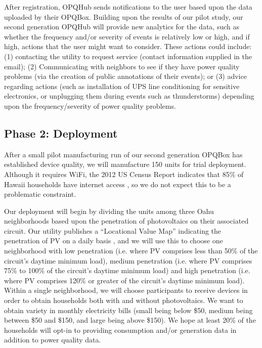 After registration, OPQHub sends notifications to the user based upon the data uploaded by their OPQBox.  Building upon the results of our pilot study, our second generation OPQHub will provide new analytics for the data, such as whether the frequency and/or severity of events is relatively low or high, and if high, actions that the user might want to consider.  These actions could include: (1) contacting the utility to request service (contact information supplied in the email); (2) Communicating with neighbors to see if they have power quality problems (via the creation of public annotations of their events); or (3) advice regarding actions (such as installation of UPS line conditioning for sensitive electronics, or unplugging them during events such as thunderstorms) depending upon the frequency/severity of power quality problems.

\subsection{Phase 2: Deployment}

After a small pilot manufacturing run of our second generation OPQBox has established device quality, we will manufacture 150 units for trial deployment.  Although it requires WiFi, the 2012 US Census Report indicates that 85\% of Hawaii households have internet access \cite{home-internet-access}, so we do not expect this to be a problematic constraint. 

Our deployment will begin by dividing the units among three Oahu neighborhoods based upon the penetration of photovoltaics on their associated circuit.  Our utility publishes a ``Locational Value Map'' indicating the penetration of PV on a daily basis \cite{lvm}, and we will use this to choose one neighborhood with low penetration (i.e. where PV comprises less than 50\% of the circuit's daytime minimum load), medium penetration (i.e. where PV comprises 75\% to 100\% of the circuit's daytime minimum load) and high penetration (i.e. where PV comprises 120\% or greater of the circuit's daytime minimum load).  Within a single neighborhood, we will choose participants to receive devices in order to obtain households both with and without photovoltaics. We want to obtain variety in monthly electricity bills (small being below \$50, medium being between \$50 and \$150, and large being above \$150).  We hope at least 20\% of the households will opt-in to providing consumption and/or generation data in addition to power quality data. 

